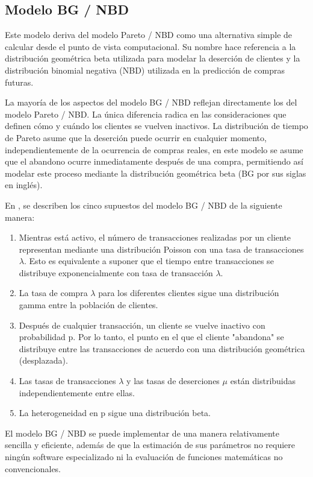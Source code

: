 \subsection{Modelo BG / NBD}

Este modelo deriva del modelo Pareto / NBD como una alternativa simple de calcular desde el punto de vista computacional. Su nombre hace referencia a la distribución geométrica beta utilizada para modelar la deserción de clientes y la distribución binomial negativa (NBD) utilizada en la predicción de compras futuras. 

	La mayoría de los aspectos del modelo BG / NBD reflejan directamente los del modelo Pareto / NBD. La única diferencia radica en las consideraciones que definen cómo y cuándo los clientes se vuelven inactivos. La distribución de tiempo de Pareto asume que la deserción puede ocurrir en cualquier momento, independientemente de la ocurrencia de compras reales, en este modelo se asume que el abandono ocurre inmediatamente después de una compra, permitiendo así modelar este proceso mediante la distribución geométrica beta (BG por sus siglas en inglés).

En \cite{fader2005}, se describen los cinco supuestos del modelo BG / NBD de la siguiente manera:

\begin{enumerate}
	\item Mientras está activo, el número de transacciones realizadas por un cliente representan mediante una distribución Poisson con una tasa de transacciones $\lambda$. Esto es equivalente a suponer que el tiempo entre transacciones se distribuye exponencialmente con tasa de transacción $\lambda$.
	\item La tasa de compra $\lambda$ para los diferentes clientes sigue una distribución gamma entre la población de clientes.
	\item Después de cualquier transacción, un cliente se vuelve inactivo con probabilidad p. Por lo tanto, el punto en el que el cliente "abandona" se distribuye entre las transacciones de acuerdo con una distribución geométrica (desplazada).	
	\item Las tasas de transacciones $\lambda$ y las tasas de deserciones $\mu$ están distribuidas independientemente entre ellas.
	\item La heterogeneidad en p sigue una distribución beta.
\end{enumerate}

El modelo BG / NBD se puede implementar de una manera relativamente sencilla y eficiente, además de que la estimación de sus parámetros no requiere ningún software especializado ni la evaluación de funciones matemáticas no convencionales.

